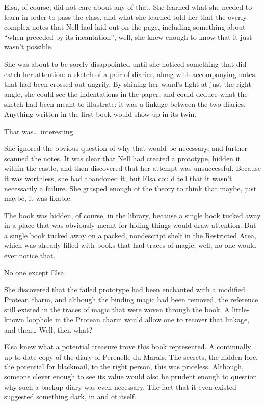 Elsa, of course, did not care about any of that. She learned what she needed to learn in order to pass the class, and what she learned told her that the overly complex notes that Nell had laid out on the page, including something about “when preceded by its incantation”, well, she knew enough to know that it just wasn’t possible.

She was about to be sorely disappointed until she noticed something that did catch her attention: a sketch of a pair of diaries, along with accompanying notes, that had been crossed out angrily. By shining her wand’s light at just the right angle, she could see the indentations in the paper, and could deduce what the sketch had been meant to illustrate: it was a linkage between the two diaries. Anything written in the first book would show up in its twin.

That was… interesting.

She ignored the obvious question of why that would be necessary, and further scanned the notes. It was clear that Nell had created a prototype, hidden it within the castle, and then discovered that her attempt was unsuccessful. Because it was worthless, she had abandoned it, but Elsa could tell that it wasn’t necessarily a failure. She grasped enough of the theory to think that maybe, just maybe, it was fixable.

The book was hidden, of course, in the library, because a single book tucked away in a place that was obviously meant for hiding things would draw attention. But a single book tucked away on a packed, nondescript shelf in the Restricted Area, which was already filled with books that had traces of magic, well, no one would ever notice that.

No one except Elsa.

She discovered that the failed prototype had been enchanted with a modified Protean charm, and although the binding magic had been removed, the reference still existed in the traces of magic that were woven through the book. A little-known loophole in the Protean charm would allow one to recover that linkage, and then… Well, then what?

Elsa knew what a potential treasure trove this book represented. A continually up-to-date copy of the diary of Perenelle du Marais. The secrets, the hidden lore, the potential for blackmail, to the right person, this was priceless. Although, someone clever enough to see its value would also be prudent enough to question why such a backup diary was even necessary. The fact that it even existed suggested something dark, in and of itself.

